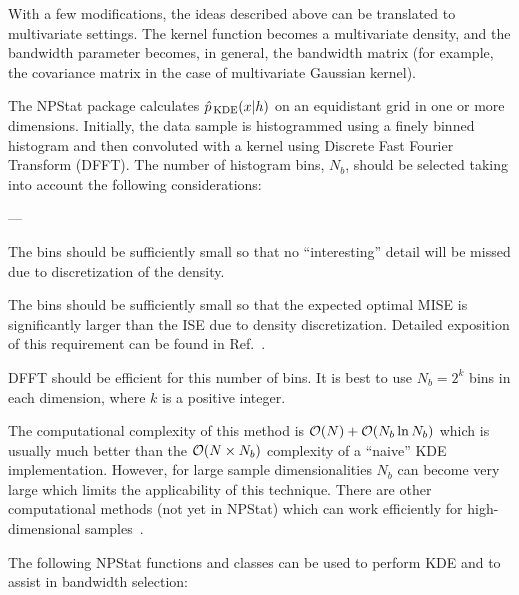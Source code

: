 \documentclass[12pt,titlepage]{article}
\newcommand{\sub}[1]{\ensuremath{_{\mbox{\scriptsize \,#1}}}}
\newenvironment{thinlist} {
    \begin{list} {---} {
        \setlength{\topsep}{0.075cm}
        \setlength{\parsep}{0.075cm}
        \setlength{\itemsep}{0.075cm}
    }
} {\end{list}}
\begin{document}
With a few modifications, the ideas described above can be translated
to multivariate settings. The kernel function becomes a multivariate
density, and the bandwidth parameter becomes, in general, the bandwidth
matrix (for example, the covariance matrix in the case of multivariate
Gaussian kernel).

The NPStat package calculates $\hat{p}\sub{KDE}(x|h)$ on an equidistant
grid in one or more dimensions.
Initially, the data sample is histogrammed using a finely
binned histogram and then convoluted with a kernel using
Discrete Fast Fourier Transform (DFFT).
The number of histogram bins, $N_b$, should be selected
taking into account the following considerations:
\begin{thinlist}
\item The bins should be sufficiently small so that no ``interesting''
      detail will be missed due to discretization of the density.

\item The bins should be sufficiently small so that the expected optimal
      MISE is significantly larger than the ISE due to
      density discretization. Detailed exposition of this
      requirement can be found in Ref.~\cite{ref:discretizedkde}.

\item DFFT should be efficient for this number of bins. It is best to use
      $N_b = 2^k$ bins in each dimension, where $k$ is a positive integer.
\end{thinlist}
The computational complexity of this method is
${\cal O}(N) + {\cal O}(N_b \ln N_b)$ which
is usually much better than the ${\cal O}(N \times N_b)$ complexity of
a ``naive'' KDE implementation. However, for large sample
dimensionalities $N_b$ can become very large which limits the
applicability of this technique. There are other computational
methods (not yet in NPStat) which can work efficiently for
high-dimensional samples~\cite{ref:fastkde1, ref:fastkde2}.

The following NPStat functions and classes can be used to perform
KDE and to assist in bandwidth selection:
\end{document}
